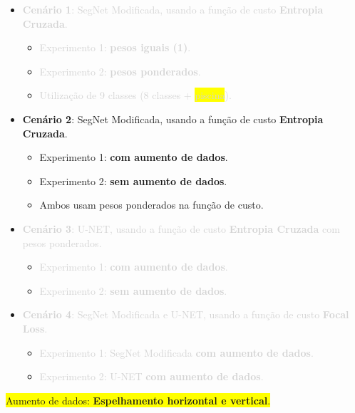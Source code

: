 \documentclass[%
  10pt,%
  aspectratio = 169,%
  compress,%
  t,%
  english,%
  brazilian,%
  tikz,
]{beamer}
\begin{document}
\begin{frame}

    \begin{itemize}
        \item \textcolor{lightgray}{\textbf{Cenário 1}: SegNet Modificada, usando a função de custo \textbf{Entropia Cruzada}.}
        \begin{itemize}
            \item \textcolor{lightgray}{Experimento 1: \textbf{pesos iguais (1)}.}
            \item \textcolor{lightgray}{Experimento 2: \textbf{pesos ponderados}.}
            \item \textcolor{lightgray}{Utilização de 9 classes (8 classes + \colorbox{yellow}{piscina}).}
        \end{itemize}
    \end{itemize}
    \begin{itemize}
        \item \textbf{Cenário 2}: SegNet Modificada, usando a função de custo \textbf{Entropia Cruzada}.
        \begin{itemize}
            \item Experimento 1: \textbf{com aumento de dados}.
            \item Experimento 2: \textbf{sem aumento de dados}.
            \item Ambos usam pesos ponderados na função de custo.
        \end{itemize}
    \end{itemize}
    \begin{itemize}
        \item \textcolor{lightgray}{\textbf{Cenário 3}: U-NET, usando a função de custo \textbf{Entropia Cruzada} com pesos ponderados.}
        \begin{itemize}
            \item \textcolor{lightgray}{Experimento 1: \textbf{com aumento de dados}.}
            \item \textcolor{lightgray}{Experimento 2: \textbf{sem aumento de dados}.}
        \end{itemize}
    \end{itemize}
    \begin{itemize}
        \item \textcolor{lightgray}{\textbf{Cenário 4}: SegNet Modificada e U-NET, usando a função de custo \textbf{Focal Loss}.}
        \begin{itemize}
            \item \textcolor{lightgray}{Experimento 1: SegNet Modificada \textbf{com aumento de dados}.}
            \item \textcolor{lightgray}{Experimento 2: U-NET \textbf{com aumento de dados}.}
        \end{itemize}
    \end{itemize}
    
    \colorbox{yellow}{Aumento de dados: \textbf{Espelhamento horizontal e vertical}.}
\end{frame}
\end{document}
